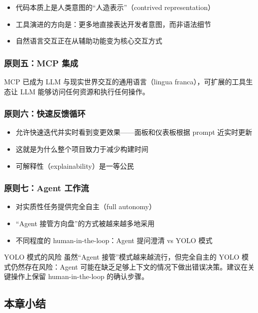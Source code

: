 \documentclass[a4paper]{article}
\begin{document}
\begin{itemize}
    \item 代码本质上是人类意图的``人造表示''（contrived representation）
    \item 工具演进的方向是：更多地直接表达开发者意图，而非语法细节
    \item 自然语言交互正在从辅助功能变为核心交互方式
\end{itemize}

\subsubsection{原则五：MCP 集成}

MCP 已成为 LLM 与现实世界交互的通用语言（lingua franca），可扩展的工具生态让 LLM 能够访问任何资源和执行任何操作。

\subsubsection{原则六：快速反馈循环}

\begin{itemize}
    \item 允许快速迭代并实时看到变更效果——面板和仪表板根据 prompt 近实时更新
    \item 这就是为什么整个项目致力于减少构建时间
    \item 可解释性（explainability）是一等公民
\end{itemize}

\subsubsection{原则七：Agent 工作流}

\begin{itemize}
    \item 对实质性任务提供完全自主（full autonomy）
    \item ``Agent 接管方向盘''的方式被越来越多地采用
    \item 不同程度的 human-in-the-loop：Agent 提问澄清 vs YOLO 模式
\end{itemize}

\begin{warningbox}{YOLO 模式的风险}
虽然``Agent 接管''模式越来越流行，但完全自主的 YOLO 模式仍然存在风险：Agent 可能在缺乏足够上下文的情况下做出错误决策。建议在关键操作上保留 human-in-the-loop 的确认步骤。
\end{warningbox}

\subsection{本章小结}
\end{document}
